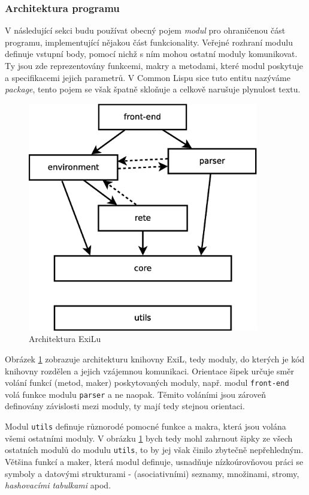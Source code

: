 \subsubsection{Architektura programu}

V následující sekci budu používat obecný pojem \emph{modul} pro ohraničenou část
programu, implementující nějakou část funkcionality. Veřejné rozhraní modulu
definuje vstupní body, pomocí nichž s ním mohou ostatní moduly komunikovat.
Ty jsou zde reprezentovány funkcemi, makry a metodami, které modul poskytuje
a specifikacemi jejich parametrů. V Common Lispu sice tuto entitu nazýváme
\emph{package}, tento pojem se však špatně skloňuje a celkově narušuje plynulost
textu.


\begin{figure}[h]
\centering
\includegraphics[height=10cm]{modules.eps}
\caption{Architektura ExiLu}
\label{modules}
\end{figure}

Obrázek \ref{modules} zobrazuje architekturu knihovny ExiL, tedy moduly, do
kterých je kód knihovny rozdělen a jejich vzájemnou komunikaci. Orientace šipek
určuje směr volání funkcí (metod, maker) poskytovaných moduly, např. modul
\verb|front-end| volá funkce modulu \verb|parser| a ne naopak. Těmito voláními
jsou zároveň definovány závislosti mezi moduly, ty mají tedy stejnou orientaci.

Modul \verb|utils| definuje různorodé pomocné funkce a makra, která jsou volána
všemi ostatními moduly. V obrázku \ref{modules} bych tedy mohl zahrnout šipky ze
všech ostatních modulů do modulu \verb|utils|, to by jej však činilo zbytečně
nepřehledným. Většina funkcí a maker, která modul definuje, usnadňuje
nízkoúrovňovou práci se symboly a datovými strukturami - (asociativními)
seznamy, množinami, stromy, \emph{hashovacími tabulkami} apod.

